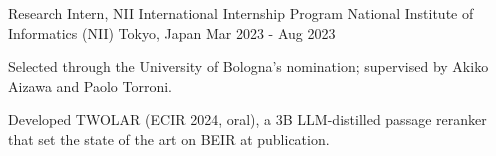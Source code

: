 \begin{cventries}
  \cventry
    {Research Intern, NII International Internship Program} %
    {National Institute of Informatics (NII)} %
    {Tokyo, Japan} %
    {Mar 2023 - Aug 2023} %
    {
      \begin{cvitems} %
        \item {Selected through the University of Bologna's nomination; supervised by Akiko Aizawa and Paolo Torroni.}
        \item {Developed TWOLAR (ECIR 2024, oral), a 3B LLM-distilled passage reranker that set the state of the art on BEIR at publication.}
      \end{cvitems}
    }

\end{cventries}
